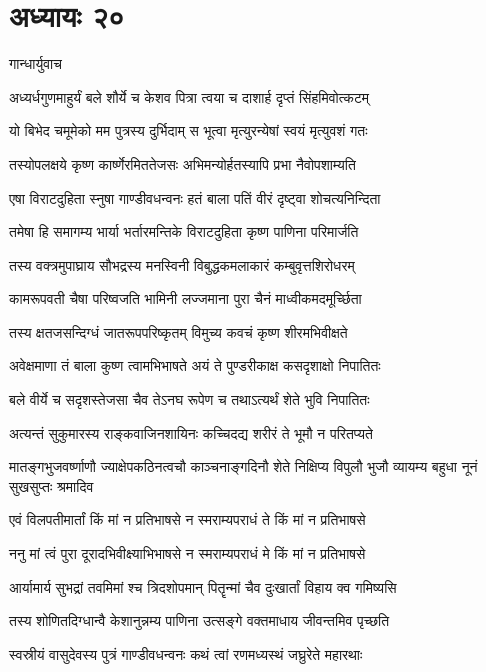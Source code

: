 \chapter{अध्यायः २०}
\twolineshloka
{गान्धार्युवाच}
{}


\twolineshloka
{अध्यर्धगुणमाहुर्यं बले शौर्ये च केशव}
{पित्रा त्वया च दाशार्ह दृप्तं सिंहमिवोत्कटम्}


\twolineshloka
{यो बिभेद चमूमेको मम पुत्रस्य दुर्भिदाम्}
{स भूत्वा मृत्युरन्येषां स्वयं मृत्युवशं गतः}


\twolineshloka
{तस्योपलक्षये कृष्ण कार्ष्णेरमिततेजसः}
{अभिमन्योर्हतस्यापि प्रभा नैवोपशाम्यति}


\twolineshloka
{एषा विराटदुहिता स्नुषा गाण्डीवधन्वनः}
{हतं बाला पतिं वीरं दृष्ट्वा शोचत्यनिन्दिता}


\twolineshloka
{तमेषा हि समागम्य भार्या भर्तारमन्तिके}
{विराटदुहिता कृष्ण पाणिना परिमार्जति}


\twolineshloka
{तस्य वक्त्रमुपाघ्राय सौभद्रस्य मनस्विनी}
{विबुद्धकमलाकारं कम्बुवृत्तशिरोधरम्}


\twolineshloka
{कामरूपवती चैषा परिष्वजति भामिनी}
{लज्जमाना पुरा चैनं माध्वीकमदमूर्च्छिता}


\twolineshloka
{तस्य क्षतजसन्दिग्धं जातरूपपरिष्कृतम्}
{विमुच्य कवचं कृष्ण शीरमभिवीक्षते}


\twolineshloka
{अवेक्षमाणा तं बाला कुष्ण त्वामभिभाषते}
{अयं ते पुण्डरीकाक्ष कसदृशाक्षो निपातितः}


\twolineshloka
{बले वीर्ये च सदृशस्तेजसा चैव तेऽनघ}
{रूपेण च तथाऽत्यर्थं शेते भुवि निपातितः}


\twolineshloka
{अत्यन्तं सुकुमारस्य राङ्कवाजिनशायिनः}
{कच्चिदद्य शरीरं ते भूमौ न परितप्यते}


\threelineshloka
{मातङ्गभुजवर्ष्णाणौ ज्याक्षेपकठिनत्वचौ}
{काञ्चनाङ्गदिनौ शेते निक्षिप्य विपुलौ भुजौ}
{व्यायम्य बहुधा नूनं सुखसुप्तः श्रमादिव}


\twolineshloka
{एवं विलपतीमार्तां किं मां न प्रतिभाषसे}
{न स्मराम्यपराधं ते किं मां न प्रतिभाषसे}


\twolineshloka
{ननु मां त्वं पुरा दूरादभिवीक्ष्याभिभाषसे}
{न स्मराम्यपराधं मे किं मां न प्रतिभाषसे}


\twolineshloka
{आर्यामार्य सुभद्रां तवमिमां श्च त्रिदशोपमान्}
{पितॄन्मां चैव दुःखार्तां विहाय क्व गमिष्यसि}


\twolineshloka
{तस्य शोणितदिग्धान्वै केशानुन्नम्य पाणिना}
{उत्सङ्गे वक्तमाधाय जीवन्तमिव पृच्छति}


\twolineshloka
{स्वस्रीयं वासुदेवस्य पुत्रं गाण्डीवधन्वनः}
{कथं त्वां रणमध्यस्थं जघ्रुरेते महारथाः}


